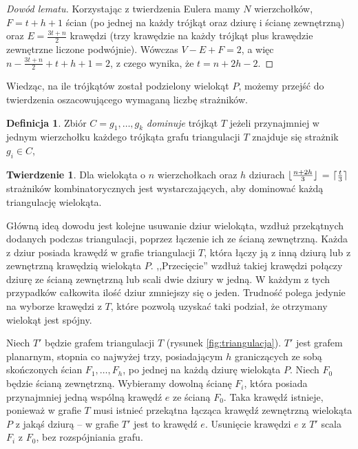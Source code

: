 \documentclass[brudnopis]{xmgr}
\DeclarePairedDelimiter\ceil{\lceil}{\rceil}
\DeclarePairedDelimiter\floor{\lfloor}{\rfloor}
\theoremstyle{definition}
\newtheorem{Twierdzenie}{Twierdzenie}
\newtheorem{Definicja}{Definicja}
\begin{document}
\begin{proof}[Dowód lematu]
	Korzystając z twierdzenia Eulera mamy $N$ wierzchołków, $F = t + h + 1$ ścian (po jednej na każdy trójkąt oraz dziurę i ścianę zewnętrzną) oraz $E = \frac{3t+n}{2}$ krawędzi (trzy krawędzie na każdy trójkąt plus krawędzie zewnętrzne liczone podwójnie).  Wówczas $V - E + F = 2$, a więc $n - \frac{3t+n}{2} + t + h + 1 = 2$, z czego wynika, że $t = n + 2h - 2$.
\end{proof}
Wiedząc, na ile trójkątów został podzielony wielokąt $P$, możemy przejść do twierdzenia oszacowującego wymaganą liczbę strażników.

\begin{Definicja} \cite{orourke}
  Zbiór $C = {g_1,\ldots,g_k}$ \emph{dominuje} trójkąt $T$ jeżeli przynajmniej w jednym wierzchołku każdego trójkąta grafu triangulacji $T$ znajduje się strażnik $g_i \in C$,
\end{Definicja}

\begin{Twierdzenie} \cite{orourke}
  Dla wielokąta o $n$ wierzchołkach oraz $h$ dziurach $\floor{\frac{n+2h}{3}}$ = $\ceil{\frac{t}{3}}$ strażników kombinatorycznych jest wystarczających, aby dominować każdą triangulację wielokąta.
\end{Twierdzenie}

\indent Główną ideą dowodu jest kolejne usuwanie dziur wielokąta, wzdłuż przekątnych dodanych podczas triangulacji, poprzez łączenie ich ze ścianą zewnętrzną. Każda z dziur posiada krawędź w grafie triangulacji $T$, która łączy ją z inną dziurą lub z zewnętrzną krawędzią wielokąta $P$. ,,Przecięcie'' wzdłuż takiej krawędzi połączy dziurę ze ścianą zewnętrzną lub scali dwie dziury w jedną. W każdym z tych przypadków całkowita ilość dziur zmniejszy się o jeden. Trudność polega jedynie na wyborze krawędzi z $T$, które pozwolą uzyskać taki podział, że otrzymany wielokąt jest spójny.

\indent Niech $T'$ będzie grafem triangulacji $T$ (rysunek \ref{fig:triangulacja}). $T'$ jest grafem planarnym, stopnia co najwyżej trzy, posiadającym $h$ graniczących ze sobą skończonych ścian $F_1, \ldots, F_h$, po jednej na każdą dziurę wielokąta $P$. Niech $F_0$ będzie ścianą zewnętrzną. Wybieramy dowolną ścianę $F_i$, która posiada przynajmniej jedną wspólną krawędź $e$ ze ścianą $F_0$. Taka krawędź istnieje, ponieważ w grafie $T$ musi istnieć przekątna łącząca krawędź zewnętrzną wielokąta $P$ z jakąś dziurą -- w grafie $T'$ jest to krawędź $e$. Usunięcie krawędzi $e$ z $T'$ scala $F_i$ z $F_0$, bez rozspójniania grafu.
\end{document}
